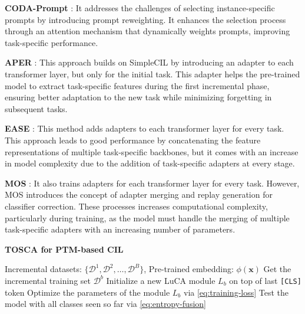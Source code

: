 \textbf{CODA-Prompt} \cite{codaprompt}: It addresses the challenges of selecting instance-specific prompts by introducing prompt reweighting. It enhances the selection process through an attention mechanism that dynamically weights prompts, improving task-specific performance.

\textbf{APER} \cite{simplecil_aper}: This approach builds on SimpleCIL by introducing an adapter to each transformer layer, but only for the initial task. This adapter helps the pre-trained model to extract task-specific features during the first incremental phase, ensuring better adaptation to the new task while minimizing forgetting in subsequent tasks.
    
\textbf{EASE} \cite{ease}: This method adds adapters to each transformer layer for every task. This approach leads to good performance by concatenating the feature representations of multiple task-specific backbones, but it comes with an increase in model complexity due to the addition of task-specific adapters at every stage.
    
\textbf{MOS} \cite{mos}: It also trains adapters for each transformer layer for every task. However, MOS introduces the concept of adapter merging and replay generation for classifier correction. These processes increases computational complexity, particularly during training, as the model must handle the merging of multiple task-specific adapters with an increasing number of parameters.


\begin{algorithm}[]
\caption{\textbf{TOSCA for PTM-based CIL}}
\label{alg:ease}
\begin{algorithmic}[1]
\REQUIRE Incremental datasets: $\{\mathcal{D}^{1}, \mathcal{D}^{2}, \ldots, \mathcal{D}^{B}\}$, Pre-trained embedding: $\phi(\mathbf{x})$
    \STATE Get the incremental training set $\mathcal{D}^{b}$
    \STATE Initialize a new LuCA module $L_{b}$ on top of last \texttt{[CLS]} token
    \STATE Optimize the parameters of the module $L_{b}$ via \cref{eq:training-loss}
    \STATE Test the model with all classes seen so far via \cref{eq:entropy-fusion}
\ENDFOR
\end{algorithmic}
\end{algorithm}

